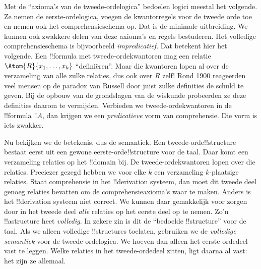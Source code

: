 \documentclass[../../../include/open-logic-section]{subfiles}
\begin{document}
Met de ``axioma's van de tweede-ordelogica'' bedoelen logici meestal het
volgende. Ze nemen de eerste-ordelogica, voegen de kwantorregels voor de
tweede orde toe en nemen ook het comprehensieschema op. Dat is de minimale
uitbreiding. We kunnen ook zwakkere delen van deze axioma's en regels
bestuderen. Het volledige comprehensieschema is bijvoorbeeld
\emph{impredicatief}. Dat betekent hier het volgende. Een !!{formula} met
tweede-ordekwantoren mag een relatie $\Atom{R}{x_1, \dots, x_k}$
``definiëren''. Maar die kwantoren lopen al over de verzameling van alle
zulke relaties, dus ook over $R$ zelf!{} Rond 1900 reageerden veel mensen op
de paradox van Russell door juist zulke definities de schuld te geven. Bij de
opbouw van de grondslagen van de wiskunde probeerden ze deze definities daarom
te vermijden. Verbieden we tweede-ordekwantoren in de !!{formula}~$!A$, dan
krijgen we een {\em predicatieve} vorm van comprehensie. Die vorm is iets
zwakker.

Nu bekijken we de betekenis, dus de semantiek. Een tweede-orde!!{structure}
bestaat eerst uit een gewone eerste-orde!!{structure} voor de taal. Daar komt
een verzameling relaties op het !!{domain} bij. De tweede-ordekwantoren lopen
over die relaties. Preciezer gezegd hebben we voor elke $k$ een verzameling
$k$-plaatsige relaties. Staat comprehensie in het !!{derivation} systeem, dan
moet dit tweede deel genoeg relaties bevatten om de comprehensieaxioma's waar
te maken. Anders is het !!{derivation} systeem niet correct. We kunnen daar
gemakkelijk voor zorgen door in het tweede deel \emph{alle} relaties op het
eerste deel op te nemen. Zo'n !!a{structure} heet \emph{volledig}. In zekere
zin is dit de ``bedoelde !!{structure}'' voor de taal. Als we alleen volledige
!!{structure}s toelaten, gebruiken we de \emph{volledige semantiek} voor de
tweede-ordelogica. We hoeven dan alleen het eerste-ordedeel vast te leggen.
Welke relaties in het tweede-ordedeel zitten, ligt daarna al vast: het zijn ze
allemaal.
\end{document}
